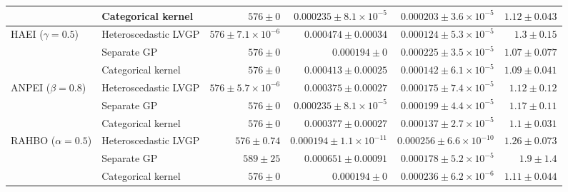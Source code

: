 \begin{table}[htbp]
\begin{tabular}{llrrrr}
 & Categorical kernel & \colorbox{green!20}{{\boldmath$576 \pm 0$}} & $0.000235 \pm 8.1{\times}10^{-5}$ & $0.000203 \pm 3.6{\times}10^{-5}$ & {\boldmath$1.12 \pm 0.043$} \\
\midrule
HAEI ($\gamma=0.5$) & Heteroscedastic LVGP & $576 \pm 7.1{\times}10^{-6}$ & $0.000474 \pm 0.00034$ & \colorbox{green!20}{{\boldmath$0.000124 \pm 5.3{\times}10^{-5}$}} & $1.3 \pm 0.15$ \\
 & Separate GP & \colorbox{green!20}{{\boldmath$576 \pm 0$}} & \colorbox{green!20}{{\boldmath$0.000194 \pm 0$}} & $0.000225 \pm 3.5{\times}10^{-5}$ & \colorbox{green!20}{{\boldmath$1.07 \pm 0.077$}} \\
 & Categorical kernel & \colorbox{green!20}{{\boldmath$576 \pm 0$}} & $0.000413 \pm 0.00025$ & $0.000142 \pm 6.1{\times}10^{-5}$ & $1.09 \pm 0.041$ \\
\midrule
ANPEI ($\beta=0.8$) & Heteroscedastic LVGP & $576 \pm 5.7{\times}10^{-6}$ & $0.000375 \pm 0.00027$ & $0.000175 \pm 7.4{\times}10^{-5}$ & $1.12 \pm 0.12$ \\
 & Separate GP & \colorbox{green!20}{{\boldmath$576 \pm 0$}} & {\boldmath$0.000235 \pm 8.1{\times}10^{-5}$} & $0.000199 \pm 4.4{\times}10^{-5}$ & $1.17 \pm 0.11$ \\
 & Categorical kernel & \colorbox{green!20}{{\boldmath$576 \pm 0$}} & $0.000377 \pm 0.00027$ & {\boldmath$0.000137 \pm 2.7{\times}10^{-5}$} & {\boldmath$1.1 \pm 0.031$} \\
\midrule
RAHBO ($\alpha=0.5$) & Heteroscedastic LVGP & $576 \pm 0.74$ & $0.000194 \pm 1.1{\times}10^{-11}$ & $0.000256 \pm 6.6{\times}10^{-10}$ & $1.26 \pm 0.073$ \\
 & Separate GP & $589 \pm 25$ & $0.000651 \pm 0.00091$ & {\boldmath$0.000178 \pm 5.2{\times}10^{-5}$} & $1.9 \pm 1.4$ \\
 & Categorical kernel & \colorbox{green!20}{{\boldmath$576 \pm 0$}} & \colorbox{green!20}{{\boldmath$0.000194 \pm 0$}} & $0.000236 \pm 6.2{\times}10^{-6}$ & {\boldmath$1.11 \pm 0.044$} \\
\bottomrule
\end{tabular}
\end{table}
